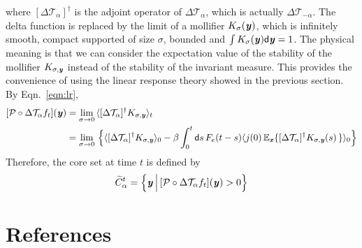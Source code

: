 \documentclass[aip,jcp,a4paper,reprint,onecolumn]{revtex4-1}
\newcommand{\vect}[1]{\textbf{\textit{#1}}}
\newcommand{\dd}{\textsf{d}}
\newcommand{\mt}{\mathcal T}
\begin{document}
where $[\Delta \mt_\alpha]^\dagger$ is the adjoint operator of $\Delta
\mt_\alpha$, which is actually $\Delta \mt_{-\alpha}$. The delta
function is replaced by the limit of a mollifier $K_\sigma(\vect y)$,
which is infinitely smooth, compact supported of size $\sigma$,
bounded and $\int
K_\sigma(\vect y)\dd \vect y = 1$.  The physical meaning is that we
can consider the expectation value of the stability of the mollifier
$K_{\sigma, \vect y}$ instead of the stability of the invariant measure.
This provides the convenience of using the linear response theory showed
in the previous section. By Eqn.~\eqref{eqn:lr},
\begin{align}\nonumber
  [\mathcal P\circ\Delta \mt_\alpha f_t](\vect y)
  &=
  \lim_{\sigma \rightarrow 0}\,
  \langle
  [\Delta \mt_\alpha]^\dagger K_{\sigma, \vect y}
  \rangle_t \\
  &=
  \lim_{\sigma \rightarrow 0}\,
  \Big\{
  \langle
  [\Delta \mt_\alpha]^\dagger K_{\sigma, \vect y}
  \rangle_0  -
  \beta
  \int_0^t\dd s\,
  F_e(t-s)
  \langle
  j(0)\,
  \mathbb E_{\vect x}\{
  [\Delta \mt_\alpha]^\dagger K_{\sigma, \vect y}(s)\,
  \}
  \rangle_0
  \Big\}
\end{align}
Therefore, the core set at time $t$ is defined by
\begin{align}
  \widetilde C_\alpha^t =
  \Big\{
  \vect y
  \,\Big\vert\,
  [\mathcal P\circ\Delta \mt_\alpha f_t](\vect y) > 0
  \Big\}
\end{align}


\section*{References}
{}

\end{document}
